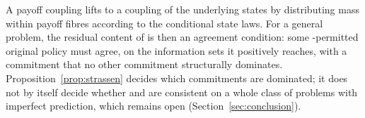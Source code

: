 A payoff coupling lifts to a coupling of the underlying states by distributing mass within payoff
fibres according to the conditional state laws. For a general problem, the residual content of
 is then an agreement condition: some -permitted original policy must agree, on the
information sets it positively reaches, with a commitment that no other commitment structurally
dominates. Proposition~\ref{prop:strassen} decides which commitments are dominated; it does not by
itself decide whether  and  are consistent on a whole class of problems with
imperfect prediction, which remains open (Section~\ref{sec:conclusion}).
